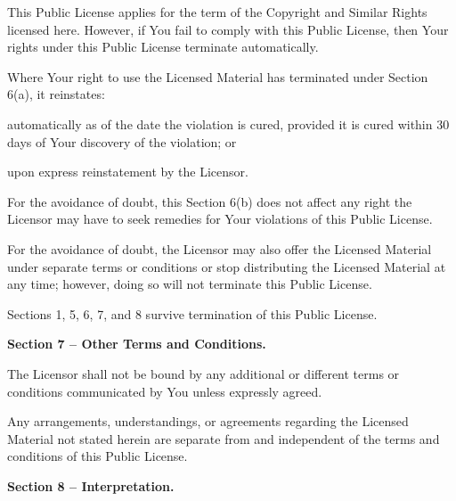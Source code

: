 \begin{doclicense@enumerate}
\item This Public License applies for the term of the Copyright and Similar Rights licensed here. However, if You fail to comply with this Public License, then Your rights under this Public License terminate automatically.
\item 
\par Where Your right to use the Licensed Material has terminated under Section 6(a), it reinstates:
\begin{doclicense@enumerate}
\item automatically as of the date the violation is cured, provided it is cured within 30 days of Your discovery of the violation; or
\item upon express reinstatement by the Licensor.
\end{doclicense@enumerate}
For the avoidance of doubt, this Section 6(b) does not affect any right the Licensor may have to seek remedies for Your violations of this Public License.
\item For the avoidance of doubt, the Licensor may also offer the Licensed Material under separate terms or conditions or stop distributing the Licensed Material at any time; however, doing so will not terminate this Public License.
\item Sections 1, 5, 6, 7, and 8 survive termination of this Public License.
\end{doclicense@enumerate}
\par \textbf{Section 7 – Other Terms and Conditions.}
\begin{doclicense@enumerate}
\item The Licensor shall not be bound by any additional or different terms or conditions communicated by You unless expressly agreed.
\item Any arrangements, understandings, or agreements regarding the Licensed Material not stated herein are separate from and independent of the terms and conditions of this Public License.
\end{doclicense@enumerate}
\par \textbf{Section 8 – Interpretation.}
